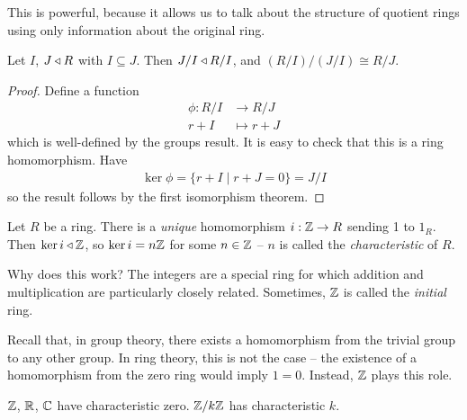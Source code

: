 \documentclass{../../template/note}
\begin{document}
    \begin{remark*}
        This is powerful, because it allows us to talk about the structure of quotient rings using only information about the original ring.
    \end{remark*}
    
    \begin{theorem}
        Let $I$, $J \triangleleft R$ with $I \subseteq J$. Then $J/I \triangleleft R/I$, and $(R/I)/(J/I) \cong R/J$.
    \end{theorem}

    \begin{proof}
        Define a function
        \begin{align*}
            \phi: R/I &\to R/J \\
            r+I &\mapsto r+J
        \end{align*}
        which is well-defined by the groups result. It is easy to check that this is a ring homomorphism. Have
        \begin{align*}
            \ker \phi = \{r + I \mid r + J = 0\} = J/I
        \end{align*}
        so the result follows by the first isomorphism theorem.
    \end{proof}
    
    \begin{proposition}
        Let $R$ be a ring. There is a \emph{unique} homomorphism $i: \mathbb Z \to R$ sending 1 to $1_R$. Then $\ker i \triangleleft \mathbb Z$, so $\ker i = n\mathbb Z$ for some $n \in \mathbb Z$ -- $n$ is called the \emph{characteristic} of $R$.
    \end{proposition}
    
    \begin{remark*}
        Why does this work? The integers are a special ring for which addition and multiplication are particularly closely related. Sometimes, $\mathbb Z$ is called the \emph{initial} ring.

        Recall that, in group theory, there exists a homomorphism from the trivial group to any other group. In ring theory, this is not the case -- the existence of a homomorphism from the zero ring would imply $1=0$. Instead, $\mathbb Z$ plays this role.
    \end{remark*}
    
    \begin{example*}
        $\mathbb Z$, $\mathbb R$, $\mathbb C$ have characteristic zero. $\mathbb Z/k\mathbb Z$ has characteristic $k$.
    \end{example*}
    
\end{document}

